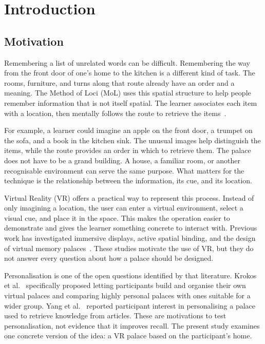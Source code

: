 \chapter{Introduction}
\label{chap:intro}

\section{Motivation}
Remembering a list of unrelated words can be difficult. Remembering the way from the front door of one's home to the kitchen is a different kind of task. The rooms, furniture, and turns along that route already have an order and a meaning. The Method of Loci (MoL) uses this spatial structure to help people remember information that is not itself spatial. The learner associates each item with a location, then mentally follows the route to retrieve the items~\cite{moll2023,reggente2020}.

For example, a learner could imagine an apple on the front door, a trumpet on the sofa, and a book in the kitchen sink. The unusual images help distinguish the items, while the route provides an order in which to retrieve them. The palace does not have to be a grand building. A house, a familiar room, or another recognisable environment can serve the same purpose. What matters for the technique is the relationship between the information, its cue, and its location.

Virtual Reality (VR) offers a practical way to represent this process. Instead of only imagining a location, the user can enter a virtual environment, select a visual cue, and place it in the space. This makes the operation easier to demonstrate and gives the learner something concrete to interact with. Previous work has investigated immersive displays, active spatial binding, and the design of virtual memory palaces~\cite{krokos2019,reggente2020,moll2023}. These studies motivate the use of VR, but they do not answer every question about how a palace should be designed.

Personalisation is one of the open questions identified by that literature. Krokos et al.~\cite{krokos2019} specifically proposed letting participants build and organise their own virtual palaces and comparing highly personal palaces with ones suitable for a wider group. Yang et al.~\cite{yang2021} reported participant interest in personalising a palace used to retrieve knowledge from articles. These are motivations to test personalisation, not evidence that it improves recall. The present study examines one concrete version of the idea: a VR palace based on the participant's home.

